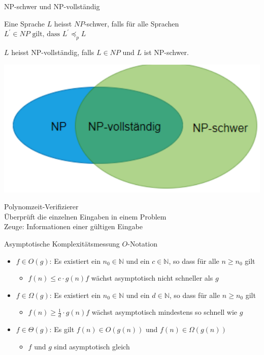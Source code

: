 \begin{concept}{NP-schwer und NP-vollständig}\\
    \begin{minipage}{0.6\linewidth}
        Eine Sprache $L$ heisst $N P$-schwer, falls für alle Sprachen
        $L^{\prime} \in N P \text { gilt, dass } L^{\prime} \preccurlyeq_{p} L$
        
        $L$ heisst NP-vollständig, falls $L \in N P$ und $L$ ist NP-schwer.
    \end{minipage}
    \begin{minipage}{0.38\linewidth}
        \includegraphics[width=1\linewidth]{p_vs_np.png}
    \end{minipage}
\end{concept}

\begin{definition}{Polynomzeit-Verifizierer}\\
    Überprüft die einzelnen Eingaben in einem Problem\\
    Zeuge: Informationen einer gültigen Eingabe
\end{definition}

\begin{KR}{Asymptotische Komplexitätsmessung}
    $O$-Notation
    \begin{itemize}
        \item $f \in O(g)$: Es existiert ein $n_{0} \in \mathbb{N}$ und ein $c \in \mathbb{N}$, so dass für alle $n \geq n_{0}$ gilt
        \begin{itemize}
            \item $f(n) \leq c \cdot g(n) f$ wächst asymptotisch nicht schneller als $g$
        \end{itemize}
        \item $f \in \Omega(g)$: Es existiert ein $n_{0} \in \mathbb{N}$ und ein $d \in \mathbb{N}$, so dass für alle $n \geq n_{0}$ gilt
        \begin{itemize}
            \item $f(n) \geq \frac{1}{d} \cdot g(n) f$ wächst asymptotisch mindestens so schnell wie $g$
        \end{itemize}
        \item $f \in \Theta(g)$: Es gilt $f(n) \in O(g(n))$ und $f(n) \in \Omega(g(n))$
        \begin{itemize}
            \item $f$ und $g$ sind asymptotisch gleich
        \end{itemize}
    \end{itemize}
\end{KR}


